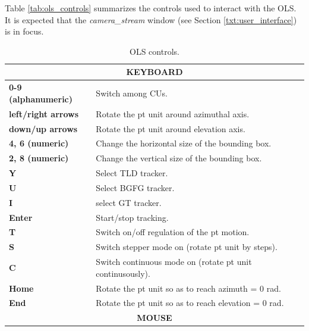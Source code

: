 Table \ref{tab:ols_controls} summarizes the controls used to interact with the OLS. It is expected that the \textit{camera\_stream} window (see Section \ref{txt:user_interface}) is in focus.

\begin{table}[htbp]
	\centering
	\caption{OLS controls.}
	\begin{tabularx}{1.0\textwidth}{lX}
		\toprule
		\multicolumn{2}{c}{\textbf{KEYBOARD}} \\
		\midrule
		\multicolumn{1}{l}{\textbf{0-9 (alphanumeric)}} & \multicolumn{1}{l}{Switch among CUs.} \\
		\multicolumn{1}{l}{\textbf{left/right arrows}} & \multicolumn{1}{l}{Rotate the \gls{pt} unit around azimuthal axis.} \\
		\multicolumn{1}{l}{\textbf{down/up arrows}} & \multicolumn{1}{l}{Rotate the \gls{pt} unit around elevation axis.} \\
		\multicolumn{1}{l}{\textbf{4, 6 (numeric)}} & \multicolumn{1}{l}{Change the horizontal size of the bounding box.} \\
		\multicolumn{1}{l}{\textbf{2, 8 (numeric)}} & \multicolumn{1}{l}{Change the vertical size of the bounding box.} \\
		\multicolumn{1}{l}{\textbf{Y}} & \multicolumn{1}{l}{Select TLD tracker.} \\
		\multicolumn{1}{l}{\textbf{U}} & \multicolumn{1}{l}{Select BGFG tracker.} \\
		\multicolumn{1}{l}{\textbf{I}} & \multicolumn{1}{l}{select GT tracker.} \\
		\multicolumn{1}{l}{\textbf{Enter}} & \multicolumn{1}{l}{Start/stop tracking.} \\
		\multicolumn{1}{l}{\textbf{T}} & \multicolumn{1}{l}{Switch on/off regulation of the \gls{pt} motion.} \\
		\multicolumn{1}{l}{\textbf{S}} & \multicolumn{1}{l}{Switch stepper mode on (rotate \gls{pt} unit by steps).} \\
		\multicolumn{1}{l}{\textbf{C}} & \multicolumn{1}{l}{Switch continuous mode on (rotate \gls{pt} unit continusously).} \\
		\multicolumn{1}{l}{\textbf{Home}} & \multicolumn{1}{l}{Rotate the \gls{pt} unit so as to reach azimuth = 0 rad.} \\
		\multicolumn{1}{l}{\textbf{End}} & \multicolumn{1}{l}{Rotate the \gls{pt} unit so as to reach elevation = 0 rad.} \\
		\toprule
		\multicolumn{2}{c}{\textbf{MOUSE}} \\

\end{tabularx}
\end{table}
